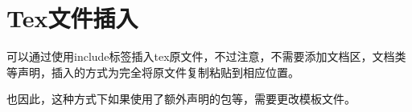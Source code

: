 \section{Tex文件插入}
可以通过使用include标签插入tex原文件，不过注意，不需要添加文档区，文档类等声明，插入的方式为完全将原文件复制粘贴到相应位置。

也因此，这种方式下如果使用了额外声明的包等，需要更改模板文件。